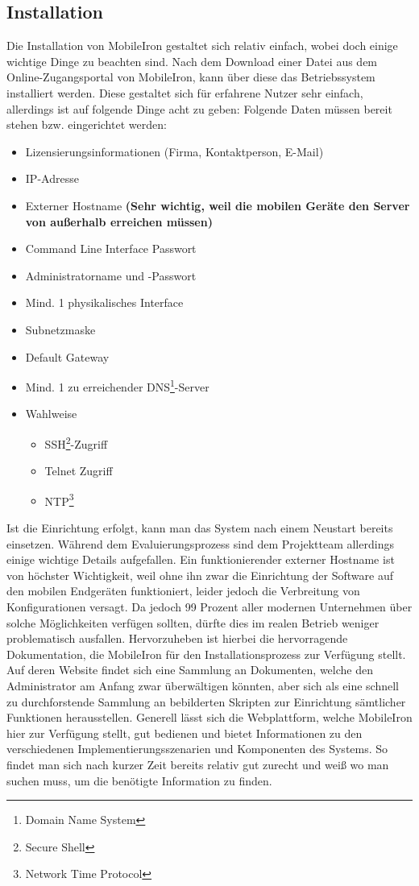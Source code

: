 \subsection{Installation}
Die Installation von MobileIron gestaltet sich relativ einfach, wobei doch einige wichtige Dinge zu beachten sind. Nach dem Download einer Datei aus dem Online-Zugangsportal von MobileIron, kann über diese das Betriebssystem installiert werden. Diese gestaltet sich für erfahrene Nutzer sehr einfach, allerdings ist auf folgende Dinge acht zu geben: \newline
Folgende Daten müssen bereit stehen bzw. eingerichtet werden:
\begin{itemize}
	\item Lizensierungsinformationen (Firma, Kontaktperson, E-Mail)
	\item IP-Adresse
	\item Externer Hostname \textbf{(Sehr wichtig, weil die mobilen Geräte den Server von außerhalb erreichen müssen)}
	\item Command Line Interface Passwort
	\item Administratorname und -Passwort
	\item Mind. 1 physikalisches Interface
	\item Subnetzmaske
	\item Default Gateway
	\item Mind. 1 zu erreichender DNS\footnote{Domain Name System}-Server
	\item Wahlweise
	\begin{itemize}
		\item SSH\footnote{Secure Shell}-Zugriff
		\item Telnet Zugriff
		\item NTP\footnote{Network Time Protocol}
	\end{itemize}
\end{itemize}
Ist die Einrichtung erfolgt, kann man das System nach einem Neustart bereits einsetzen. Während dem Evaluierungsprozess sind dem Projektteam allerdings einige wichtige Details aufgefallen. Ein funktionierender externer Hostname ist von höchster Wichtigkeit, weil ohne ihn zwar die Einrichtung der Software auf den mobilen Endgeräten funktioniert, leider jedoch die Verbreitung von Konfigurationen versagt. Da jedoch 99 Prozent aller modernen Unternehmen über solche Möglichkeiten verfügen sollten, dürfte dies im realen Betrieb weniger problematisch ausfallen. Hervorzuheben ist hierbei die hervorragende Dokumentation, die MobileIron für den Installationsprozess zur Verfügung stellt. Auf deren Website findet sich eine Sammlung an Dokumenten, welche den Administrator am Anfang zwar überwältigen könnten, aber sich als eine schnell zu durchforstende Sammlung an bebilderten Skripten zur Einrichtung sämtlicher Funktionen herausstellen. Generell lässt sich die Webplattform, welche MobileIron hier zur Verfügung stellt, gut bedienen und bietet Informationen zu den verschiedenen Implementierungsszenarien und Komponenten des Systems. So findet man sich nach kurzer Zeit bereits relativ gut zurecht und weiß wo man suchen muss, um die benötigte Information zu finden.

